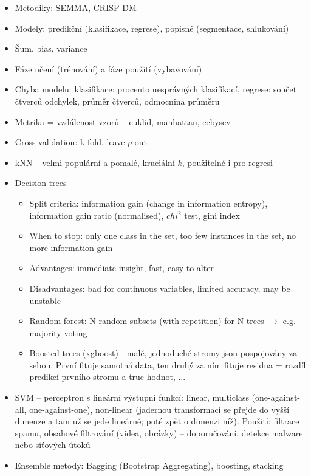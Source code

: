 \documentclass[a4paper,hidelinks]{article}
\begin{document}
\begin{itemize}
    \item Metodiky: SEMMA, CRISP-DM
    \item Modely: predikční (klasifikace, regrese), popisné (segmentace, shlukování)
    \item Šum, bias, variance
    \item Fáze učení (trénování) a fáze použití (vybavování)
    \item Chyba modelu: klasifikace: procento nesprávných klasifikací, regrese: součet čtverců odchylek, průměr čtverců, odmocnina průměru
    \item Metrika = vzdálenost vzorů -- euklid, manhattan, cebysev
    \item Cross-validation: k-fold, leave-$p$-out
    \item kNN -- velmi populární a pomalé, kruciální $k$, použitelné i pro regresi
    \item Decision trees
    \begin{itemize}
        \item Split criteria: information gain (change in information entropy), information gain ratio (normalised), $chi^2$ test, gini index
        \item When to stop: only one class in the set, too few instances in the set, no more information gain
        \item Advantages: immediate insight, fast, easy to alter
        \item Disadvantages: bad for continuous variables, limited accuracy, may be unstable
        \item Random forest: N random subsets (with repetition) for N trees $\to$ e.g. majority voting
        \item Boosted trees (xgboost) - malé, jednoduché stromy jsou pospojovány za sebou. První fituje samotná data, ten druhý za ním fituje residua = rozdíl predikcí prvního stromu a true hodnot, ...
    \end{itemize}
    \item SVM -- perceptron s lineární výstupní funkcí: linear, multiclass (one-against-all, one-against-one), non-linear (jadernou transformací se přejde do vyšší dimenze a tam už se jede lineárně; poté zpět o dimenzi níž). Použití: filtrace spamu, obsahové filtrování (videa, obrázky) -- doporučování, detekce malware nebo síťových útoků
    \item Ensemble metody: Bagging (Bootstrap Aggregating), boosting, stacking
\end{itemize}
\end{document}
